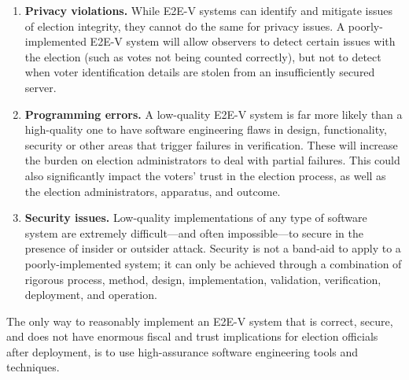 \begin{enumerate}
\item \textbf{Privacy violations.} While E2E-V systems can identify
  and mitigate issues of election integrity, they cannot do the same
  for privacy issues. A poorly-implemented E2E-V system will allow
  observers to detect certain issues with the election (such as votes
  not being counted correctly), but not to detect when voter
  identification details are stolen from an insufficiently secured
  server.
\item \textbf{Programming errors.} A low-quality E2E-V system is far
  more likely than a high-quality one to have software engineering
  flaws in design, functionality, security or other areas that trigger
  failures in verification. These will increase the burden on election
  administrators to deal with partial failures. This could also
  significantly impact the voters' trust in the election process, as
  well as the election administrators, apparatus, and outcome.
\item \textbf{Security issues.} Low-quality implementations of any
  type of software system are extremely difficult---and often
  impossible---to secure in the presence of insider or outsider
  attack. Security is not a band-aid to apply to a poorly-implemented
  system; it can only be achieved through a combination of rigorous
  process, method, design, implementation, validation, verification,
  deployment, and operation.
\end{enumerate}

The only way to reasonably implement an E2E-V system that is correct,
secure, and does not have enormous fiscal and trust implications for
election officials after deployment, is to use high-assurance software
engineering tools and techniques.

